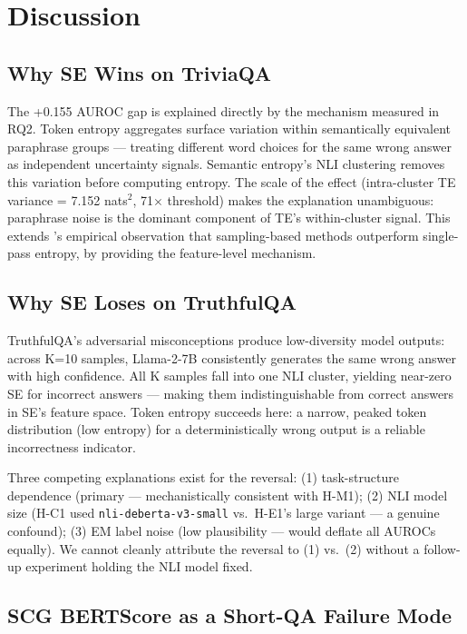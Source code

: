 \section{Discussion}
\label{sec:discussion}

\subsection{Why SE Wins on TriviaQA}

The +0.155 AUROC gap is explained directly by the mechanism measured in RQ2.
Token entropy aggregates surface variation within semantically equivalent paraphrase groups --- treating different word choices for the same wrong answer as independent uncertainty signals.
Semantic entropy's NLI clustering removes this variation before computing entropy.
The scale of the effect (intra-cluster TE variance = 7.152 nats$^2$, 71$\times$ threshold) makes the explanation unambiguous: paraphrase noise is the dominant component of TE's within-cluster signal.
This extends \citet{Huang2023}'s empirical observation that sampling-based methods outperform single-pass entropy, by providing the feature-level mechanism.

\subsection{Why SE Loses on TruthfulQA}

TruthfulQA's adversarial misconceptions produce low-diversity model outputs: across K=10 samples, Llama-2-7B consistently generates the same wrong answer with high confidence.
All K samples fall into one NLI cluster, yielding near-zero SE for incorrect answers --- making them indistinguishable from correct answers in SE's feature space.
Token entropy succeeds here: a narrow, peaked token distribution (low entropy) for a deterministically wrong output is a reliable incorrectness indicator.

Three competing explanations exist for the reversal: (1) task-structure dependence (primary --- mechanistically consistent with H-M1); (2) NLI model size (H-C1 used \texttt{nli-deberta-v3-small} vs.\ H-E1's large variant --- a genuine confound); (3) EM label noise (low plausibility --- would deflate all AUROCs equally).
We cannot cleanly attribute the reversal to (1) vs.\ (2) without a follow-up experiment holding the NLI model fixed.

\subsection{SCG BERTScore as a Short-QA Failure Mode}

